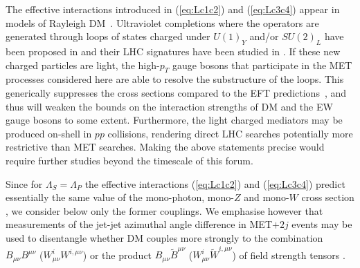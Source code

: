 The effective interactions introduced in (\ref{eq:Lc1c2}) and  (\ref{eq:Lc3c4}) appear  in models of Rayleigh DM~\cite{Weiner:2012cb}. Ultraviolet completions where the operators are generated through loops of states charged under $U(1)_Y$ and/or $SU(2)_L$  have been proposed in \cite{Weiner:2012gm} and their LHC signatures have been studied in \cite{Liu:2013gba}. If these new charged particles  are  light, the high-$p_T$ gauge bosons that participate in  the MET processes considered here are able to resolve the substructure of the loops. This generically suppresses the cross sections compared to the EFT predictions~\cite{Haisch:2012kf}, and thus will weaken the bounds on the interaction strengths of  DM and the EW gauge bosons  to some extent.  Furthermore, the light charged mediators may be produced  on-shell in $pp$ collisions, rendering direct LHC searches potentially more restrictive than MET searches. Making the above statements precise would require further studies beyond the timescale of this forum.

Since for $\Lambda_S = \Lambda_P$ the effective interactions (\ref{eq:Lc1c2}) and (\ref{eq:Lc3c4}) predict essentially the same value of the mono-photon, mono-$Z$ and mono-$W$ cross section \cite{Carpenter:2012rg,Crivellin:2015wva}, we consider below only the former couplings. We emphasise however that measurements of the jet-jet azimuthal angle difference in  MET$+ 2 j$ events may be used to disentangle whether DM couples more strongly to the combination $B_{\mu \nu} B^{\mu \nu}$ ($W_{\mu \nu}^i W^{i, \mu \nu }$) or the product $B_{\mu \nu} \tilde B^{\mu \nu}$ ($W_{\mu \nu}^i \tilde W^{i, \mu \nu }$) of field strength tensors \cite{Cotta:2012nj,Crivellin:2015wva}.

